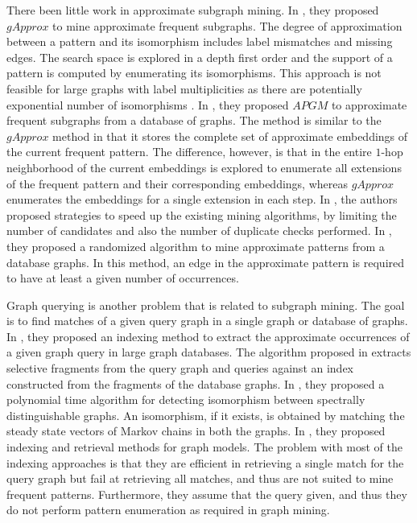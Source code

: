 There been little work in approximate subgraph
mining.  In \cite{gapprox}, they proposed $gApprox$ to mine approximate
frequent subgraphs.  The degree of approximation between a pattern and its
isomorphism includes label mismatches and missing edges. The search space
is explored in a depth first order and the support of a pattern is
computed by enumerating its isomorphisms. This approach is not feasible
for large graphs with label multiplicities as there are potentially
exponential number of isomorphisms \cite{2012-kais}.
In \cite{JiaZH11}, they proposed $APGM$ to approximate frequent
subgraphs from a database of graphs. The method is similar to the
$gApprox$ method in that it stores the complete set of approximate
embeddings of the current frequent pattern. The difference, however, is
that in \cite{JiaZH11} the entire $1$-hop neighborhood of the current
embeddings is explored to enumerate all extensions of the frequent
pattern and their corresponding embeddings, whereas $gApprox$ enumerates
the embeddings for a single extension in each step.  
In \cite{SpeedUpFAS}, the authors proposed strategies
to speed up the existing mining algorithms, by
limiting the number of candidates and also the number of duplicate
checks performed.
In \cite{RAM2008}, they proposed a randomized algorithm to mine
approximate patterns from a database graphs. In this method, an edge in
the approximate pattern is required to have at least a given number of
occurrences. 

Graph querying is another problem that is related to
subgraph mining. The goal is to find matches of a given query graph in a
single graph or database of graphs.  In \cite{TALE}, they proposed an
indexing method to extract the approximate occurrences of a given graph
query in large graph databases.  The algorithm proposed in
\cite{yan.icde:2006} extracts selective fragments from the query graph
and queries against an index constructed from the fragments of the
database graphs. In \cite{RandomMatching}, they proposed a polynomial
time algorithm for detecting isomorphism between spectrally
distinguishable graphs. An isomorphism, if it exists, 
is obtained by matching
the steady state vectors of Markov chains in both the graphs.  In
\cite{BerettiIndexing}, they proposed indexing and retrieval methods for
graph models. The problem with most of the indexing approaches is that
they are efficient in retrieving a single match for the query graph but
fail at retrieving all matches, and thus are not suited to mine frequent
patterns. Furthermore, they assume that the query given, and thus they
do not perform pattern enumeration as required in graph mining.

